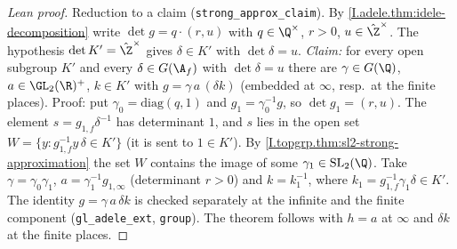 \begin{proof}[Lean proof]
Reduction to a claim (\texttt{strong\_approx\_claim}). By \cref{I.adele.thm:idele-decomposition} write $\det g=q\cdot(r,u)$ with $q\in\Q^\times$, $r>0$, $u\in\hat\Z^\times$. The hypothesis $\det K'=\hat\Z^\times$ gives $\delta\in K'$ with $\det\delta=u$. \emph{Claim:} for every open subgroup $K'$ and every $\delta\in G(\A_f)$ with $\det\delta=u$ there are $\gamma\in G(\Q)$, $a\in\GL_2(\R)^+$, $k\in K'$ with $g=\gamma\,a\,(\delta k)$ (embedded at $\infty$, resp.\ at the finite places). Proof: put $\gamma_0=\mathrm{diag}(q,1)$ and $g_1=\gamma_0^{-1}g$, so $\det g_1=(r,u)$. The element $s=g_{1,f}\delta^{-1}$ has determinant $1$, and $s$ lies in the open set $W=\{y:g_{1,f}^{-1}y\,\delta\in K'\}$ (it is sent to $1\in K'$). By \cref{I.topgrp.thm:sl2-strong-approximation} the set $W$ contains the image of some $\gamma_1\in\mathrm{SL}_2(\Q)$. Take $\gamma=\gamma_0\gamma_1$, $a=\gamma_1^{-1}g_{1,\infty}$ (determinant $r>0$) and $k=k_1^{-1}$, where $k_1=g_{1,f}^{-1}\gamma_1\delta\in K'$. The identity $g=\gamma\,a\,\delta k$ is checked separately at the infinite and the finite component (\texttt{gl\_adele\_ext}, \texttt{group}). The theorem follows with $h=a$ at $\infty$ and $\delta k$ at the finite places.
\end{proof}


